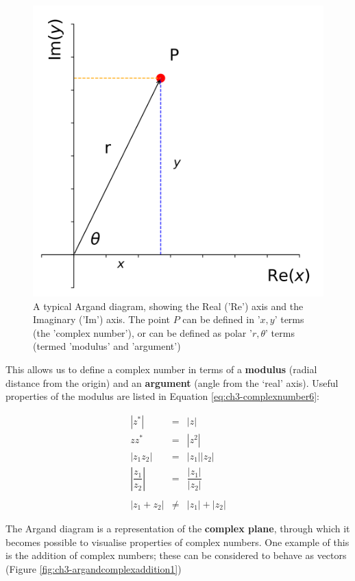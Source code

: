 \documentclass[
]{book}
\begin{document}
\begin{figure}

{\centering \includegraphics[width=0.7\linewidth]{visualisations/ch3-complexnumbers1} 

}

\caption{A typical Argand diagram, showing the Real ('Re') axis and the Imaginary ('Im') axis. The point $P$ can be defined in '$x,y$' terms (the 'complex number'), or can be defined as polar '$r,\theta$' terms (termed 'modulus' and 'argument')}\label{fig:ch3-argand1}
\end{figure}

This allows us to define a complex number in terms of a \textbf{modulus} (radial distance from the origin) and an \textbf{argument} (angle from the `real' axis). Useful properties of the modulus are listed in Equation \eqref{eq:ch3-complexnumber6}:

\begin{equation}
\begin{array}{rcl}
|z^* | &=& |z| \\
zz^* &=& |z^2| \\
 |z_1 z_2| &=& |z_1 | |z_2| \\
|\dfrac{z_1}{z_2}| &=& \dfrac{|z_1|}{|z_2|} \\
\\
|z_1 + z_2| &\neq& |z_1 | + |z_2|
\end{array}
\label{eq:ch3-complexnumber6}
\end{equation}

The Argand diagram is a representation of the \textbf{complex plane}, through which it becomes possible to visualise properties of complex numbers. One example of this is the addition of complex numbers; these can be considered to behave as vectors (Figure \ref{fig:ch3-argandcomplexaddition1})
\end{document}
